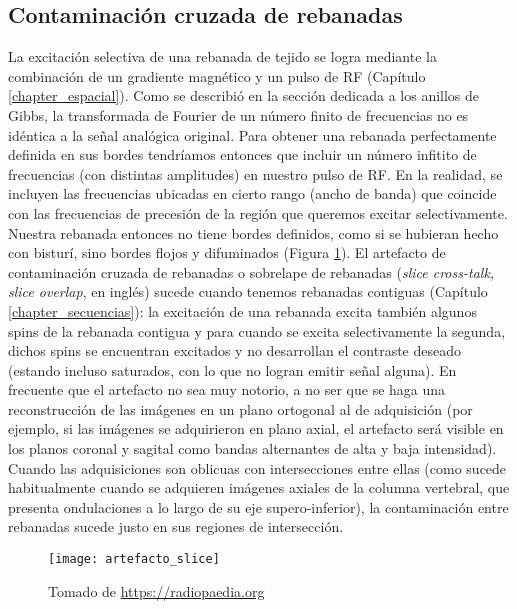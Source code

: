 \subsection{Contaminación cruzada de rebanadas}
La excitación selectiva de una rebanada de tejido se logra mediante la combinación de un gradiente magnético y un pulso de RF (Capítulo \ref{chapter_espacial}). Como se describió en la sección dedicada a los anillos de Gibbs, la transformada de Fourier de un número finito de frecuencias no es idéntica a la señal analógica original. Para obtener una rebanada perfectamente definida en sus bordes tendríamos entonces que incluir un número infitito de frecuencias (con distintas amplitudes) en nuestro pulso de RF. En la realidad, se incluyen las frecuencias ubicadas en cierto rango (ancho de banda) que coincide con las frecuencias de precesión de la región que queremos excitar selectivamente. Nuestra rebanada entonces no tiene bordes definidos, como si se hubieran hecho con bisturí, sino bordes flojos y difuminados (Figura \ref{fig:artefacto_slice}). El artefacto de contaminación cruzada de rebanadas o sobrelape de rebanadas (\textit{slice cross-talk, slice overlap}, en inglés) sucede cuando tenemos rebanadas contiguas (Capítulo \ref{chapter_secuencias}): la excitación de una rebanada excita también algunos spins de la rebanada contigua y para cuando se excita selectivamente la segunda, dichos spins se encuentran excitados y no desarrollan el contraste deseado (estando incluso saturados, con lo que no logran emitir señal alguna). En frecuente que el artefacto no sea muy notorio, a no ser que se haga una reconstrucción de las imágenes en un plano ortogonal al de adquisición (por ejemplo, si las imágenes se adquirieron en plano axial, el artefacto será visible en los planos coronal y sagital como bandas alternantes de alta y baja intensidad). Cuando las adquisiciones son oblicuas con intersecciones entre ellas (como sucede habitualmente cuando se adquieren imágenes axiales de la columna vertebral, que presenta ondulaciones a lo largo de su eje supero-inferior), la contaminación entre rebanadas sucede justo en sus regiones de intersección.

\begin{figure}[htb]
 \begin{figg}
   \texttt{[image: artefacto\_slice]}
   \caption{\figurapendiente Tomado de \url{https://radiopaedia.org}}
 \label{fig:artefacto_slice}
 \end{figg}
\end{figure}


